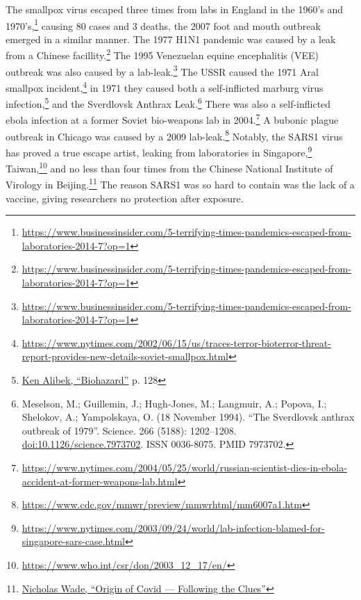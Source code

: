 \documentclass[11pt]{article}
\begin{document}
The smallpox virus escaped three times from labs in England in the 1960’s and 1970’s,\footnote{\url{https://www.businessinsider.com/5-terrifying-times-pandemics-escaped-from-laboratories-2014-7?op=1}} causing 80 cases and 3 deaths, the 2007 foot and mouth outbreak emerged in a similar manner. The 1977 H1N1 pandemic was caused by a leak from a Chinese facillity.\footnote{\url{https://www.businessinsider.com/5-terrifying-times-pandemics-escaped-from-laboratories-2014-7?op=1}} The 1995 Venezuelan equine encephalitis (VEE) outbreak was also caused by a lab-leak.\footnote{\url{https://www.businessinsider.com/5-terrifying-times-pandemics-escaped-from-laboratories-2014-7?op=1}} The USSR caused the 1971 Aral smallpox incident,\footnote{\url{https://www.nytimes.com/2002/06/15/us/traces-terror-bioterror-threat-report-provides-new-details-soviet-smallpox.html}} in 1971 they caused both a self-inflicted marburg virus infection,\footnote{\href{https://www.nlm.nih.gov/nichsr/esmallpox/biohazard\_alibek.pdf}{Ken Alibek, ``Biohazard''} p. 128} and the Sverdlovsk Anthrax Leak.\footnote{Meselson, M.; Guillemin, J.; Hugh-Jones, M.; Langmuir, A.; Popova, I.; Shelokov, A.; Yampolskaya, O. (18 November 1994). ``The Sverdlovsk anthrax outbreak of 1979''. Science. 266 (5188): 1202–1208. \href{https://doi.org/10.1126/science.7973702}{doi:10.1126/science.7973702}. ISSN 0036-8075. PMID 7973702.} There was also a self-inflicted ebola infection at a former Soviet bio-weapons lab in 2004.\footnote{\url{https://www.nytimes.com/2004/05/25/world/russian-scientist-dies-in-ebola-accident-at-former-weapons-lab.html}} A bubonic plague outbreak in Chicago was caused by a 2009 lab-leak.\footnote{\url{https://www.cdc.gov/mmwr/preview/mmwrhtml/mm6007a1.htm}} Notably, the SARS1 virus has proved a true escape artist, leaking from laboratories in Singapore,\footnote{\url{https://www.nytimes.com/2003/09/24/world/lab-infection-blamed-for-singapore-sars-case.html}} Taiwan,\footnote{\url{https://www.who.int/csr/don/2003\_12\_17/en/}} and no less than four times from the Chinese National Institute of Virology in Beijing.\footnote{\href{https://nicholaswade.medium.com/origin-of-covid-following-the-clues-6f03564c038}{Nicholas Wade, ``Origin of Covid --- Following the Clues''}} The reason SARS1 was so hard to contain was the lack of a vaccine, giving researchers no protection after exposure.
\end{document}
